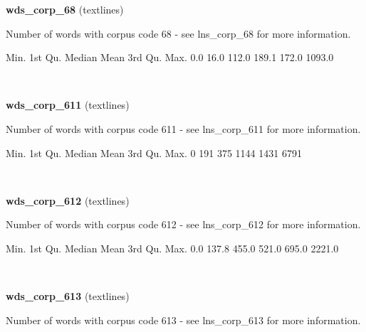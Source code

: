 \documentclass[]{article}
\newenvironment{Shaded}{\begin{snugshade}}{\end{snugshade}}
\newcommand{\DecValTok}[1]{\textcolor[rgb]{0.00,0.00,0.81}{{#1}}}
\newcommand{\FloatTok}[1]{\textcolor[rgb]{0.00,0.00,0.81}{{#1}}}
\newcommand{\NormalTok}[1]{{#1}}
\begin{document}
\vspace{1em}

\textbf{wds\_corp\_68} (textlines)

Number of words with corpus code 68 - see lns\_corp\_68 for more
information.

\begin{Shaded}
\begin{Highlighting}[]
   \NormalTok{Min. 1st Qu.  Median    Mean 3rd Qu.    Max. }
    \FloatTok{0.0}    \FloatTok{16.0}   \FloatTok{112.0}   \FloatTok{189.1}   \FloatTok{172.0}  \FloatTok{1093.0} 
\end{Highlighting}
\end{Shaded}

~

\vspace{1em}

\textbf{wds\_corp\_611} (textlines)

Number of words with corpus code 611 - see lns\_corp\_611 for more
information.

\begin{Shaded}
\begin{Highlighting}[]
   \NormalTok{Min. 1st Qu.  Median    Mean 3rd Qu.    Max. }
      \DecValTok{0}     \DecValTok{191}     \DecValTok{375}    \DecValTok{1144}    \DecValTok{1431}    \DecValTok{6791} 
\end{Highlighting}
\end{Shaded}

~

\vspace{1em}

\textbf{wds\_corp\_612} (textlines)

Number of words with corpus code 612 - see lns\_corp\_612 for more
information.

\begin{Shaded}
\begin{Highlighting}[]
   \NormalTok{Min. 1st Qu.  Median    Mean 3rd Qu.    Max. }
    \FloatTok{0.0}   \FloatTok{137.8}   \FloatTok{455.0}   \FloatTok{521.0}   \FloatTok{695.0}  \FloatTok{2221.0} 
\end{Highlighting}
\end{Shaded}

~

\vspace{1em}

\textbf{wds\_corp\_613} (textlines)

Number of words with corpus code 613 - see lns\_corp\_613 for more
information.
\end{document}
